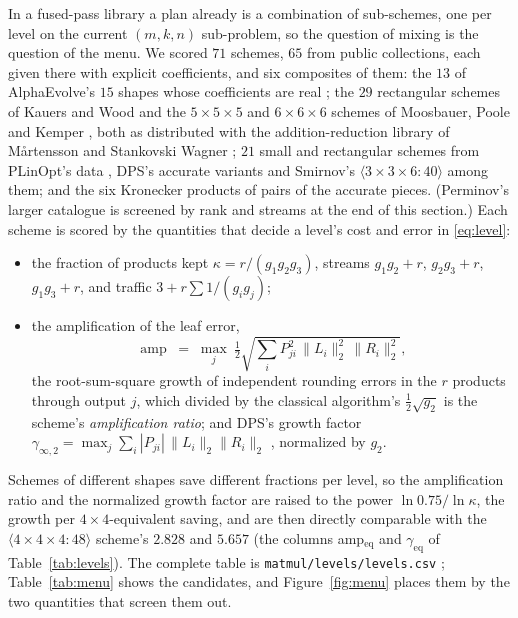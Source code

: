 \documentclass[11pt]{article}
\newcommand{\mm}[1]{\langle #1\rangle}
\newcommand{\ginf}{\gamma_{\infty,2}}
\newcommand{\amp}{\operatorname{amp}}
\begin{document}
In a fused-pass library a plan already is a combination of sub-schemes, one
per level on the current $(m,k,n)$ sub-problem, so the question of mixing is
the question of the menu.  We scored $71$ schemes, $65$ from public
collections, each given there with explicit coefficients, and six composites of them: the $13$ of
AlphaEvolve's $15$ shapes whose coefficients are real
\cite{Novikov25}; the $29$ rectangular schemes of Kauers and Wood \cite{KW}
and the $5\times5\times5$ and $6\times6\times6$ schemes of Moosbauer, Poole
and Kemper \cite{MP25}, both as distributed with the addition-reduction
library of M\r{a}rtensson and Stankovski Wagner \cite{MSW25}; $21$ small and
rectangular schemes from PLinOpt's data \cite{PLinOpt}, DPS's accurate
variants and Smirnov's $\mm{3\times3\times6:40}$ \cite{Smirnov13} among
them; and the six Kronecker products of pairs of the accurate pieces.  (Perminov's
larger catalogue is screened by rank and streams at the end of this
section.)  Each scheme is scored by the
quantities that decide a level's cost and error in \eqref{eq:level}:
\begin{itemize}
\item the fraction of products kept $\kappa=r/(g_1g_2g_3)$, streams $g_1g_2+r$, $g_2g_3+r$, $g_1g_3+r$, and
  traffic $3 + r\sum 1/(g_ig_j)$;
\item the amplification of the leaf error,
\begin{equation}\label{eq:amp}
\amp \;=\; \max_j\ \tfrac12\sqrt{\textstyle\sum_i P_{ji}^2\,\|L_i\|_2^2\,\|R_i\|_2^2},
\end{equation}
  the root-sum-square growth of independent rounding errors in the $r$
  products through output $j$, which divided by the classical algorithm's $\tfrac12\sqrt{g_2}$ is the scheme's \emph{amplification ratio}; and DPS's growth factor $\ginf=\max_j\sum_i
  |P_{ji}|\,\|L_i\|_2\|R_i\|_2$ \cite{DPS24,DPS26a}, normalized by $g_2$.
\end{itemize}
Schemes of different shapes save different fractions per level, so the amplification ratio and the normalized growth factor are raised to the power $\ln0.75/\ln\kappa$, the
growth per $4\times4$-equivalent saving, and are then directly comparable with
the $\mm{4\times4\times4:48}$ scheme's $2.828$ and $5.657$ (the columns amp$_{\text{eq}}$ and
$\gamma_{\text{eq}}$ of Table~\ref{tab:levels}).  The complete table is
\texttt{matmul/levels/levels.csv} \cite{logic}; Table~\ref{tab:menu} shows the
candidates, and Figure~\ref{fig:menu} places them by the two quantities that
screen them out.
\end{document}
